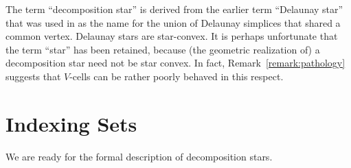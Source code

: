 The term ``decomposition star'' is derived from the earlier term
``Delaunay star'' that was used in \cite{remarks} as the name for
the union of Delaunay simplices that shared a common vertex.
Delaunay stars are star-convex.  It is perhaps unfortunate that
the term ``star'' has been retained, because (the geometric
realization of) a decomposition star need not be star convex. In
fact, Remark~\ref{remark:pathology} suggests that $V$-cells can be
rather poorly behaved in this respect.


\bigskip


\section{Indexing Sets}
\label{sec:indexing}

We are ready for the formal description of decomposition stars.

